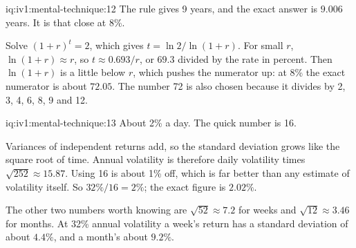 \begin{solution}{iq:iv1:mental-technique:12}
The rule gives 9 years, and the exact answer is $9.006$ years. It is that close at 8\%.

Solve $(1 + r)^t = 2$, which gives $t = \ln 2 / \ln(1 + r)$. For small $r$, $\ln(1 + r) \approx r$, so $t \approx 0.693/r$, or $69.3$ divided by the rate in percent. Then $\ln(1 + r)$ is a little below $r$, which pushes the numerator up: at 8\% the exact numerator is about $72.05$. The number 72 is also chosen because it divides by 2, 3, 4, 6, 8, 9 and 12.

\end{solution}

\begin{solution}{iq:iv1:mental-technique:13}
About 2\% a day. The quick number is 16.

Variances of independent returns add, so the standard deviation grows like the square root of time. Annual volatility is therefore daily volatility times $\sqrt{252} \approx 15.87$. Using 16 is about 1\% off, which is far better than any estimate of volatility itself. So $32\% / 16 = 2\%$; the exact figure is $2.02\%$.

The other two numbers worth knowing are $\sqrt{52} \approx 7.2$ for weeks and $\sqrt{12} \approx 3.46$ for months. At 32\% annual volatility a week's return has a standard deviation of about $4.4\%$, and a month's about $9.2\%$.

\end{solution}

